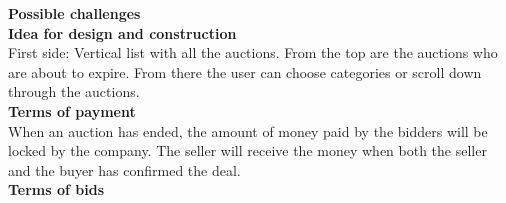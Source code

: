 \textbf{Possible challenges}\\

\textbf{Idea for design and construction}\\
First side: Vertical list with all the auctions. From the top are the auctions who are about to expire. From there the user can choose categories or scroll down through the auctions.\\

\textbf{Terms of payment}\\
When an auction has ended, the amount of money paid by the bidders will be locked by the company. The seller will receive the money when both the seller and the buyer has confirmed the deal.\\  

\textbf{Terms of bids}\\
